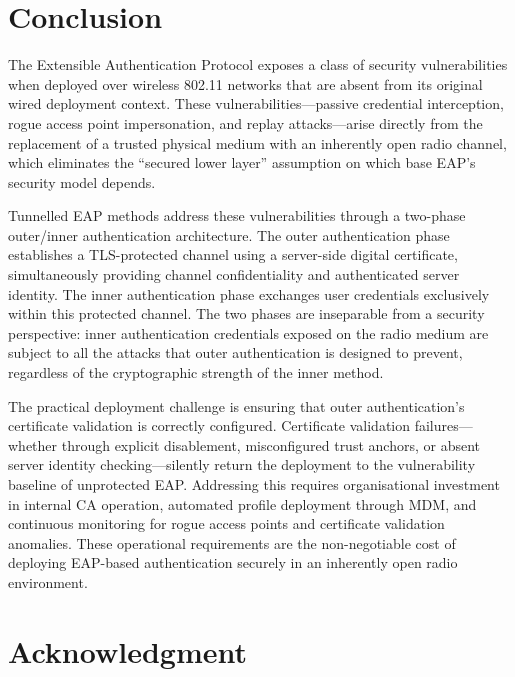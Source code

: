 \documentclass[journal]{IEEEtran}
\begin{document}
\section{Conclusion}

The Extensible Authentication Protocol exposes a class of security vulnerabilities
when deployed over wireless 802.11 networks that are absent from its original wired
deployment context. These vulnerabilities---passive credential interception, rogue
access point impersonation, and replay attacks---arise directly from the replacement
of a trusted physical medium with an inherently open radio channel, which eliminates
the ``secured lower layer'' assumption on which base EAP's security model depends.

Tunnelled EAP methods address these vulnerabilities through a two-phase
outer/inner authentication architecture. The outer authentication phase establishes
a TLS-protected channel using a server-side digital certificate, simultaneously
providing channel confidentiality and authenticated server identity. The inner
authentication phase exchanges user credentials exclusively within this protected
channel. The two phases are inseparable from a security perspective: inner
authentication credentials exposed on the radio medium are subject to all the attacks
that outer authentication is designed to prevent, regardless of the cryptographic
strength of the inner method.

The practical deployment challenge is ensuring that outer authentication's certificate
validation is correctly configured. Certificate validation failures---whether through
explicit disablement, misconfigured trust anchors, or absent server identity
checking---silently return the deployment to the vulnerability baseline of unprotected
EAP. Addressing this requires organisational investment in internal CA operation,
automated profile deployment through MDM, and continuous monitoring for rogue access
points and certificate validation anomalies. These operational requirements are the
non-negotiable cost of deploying EAP-based authentication securely in an inherently
open radio environment.

\section*{Acknowledgment}
\end{document}
